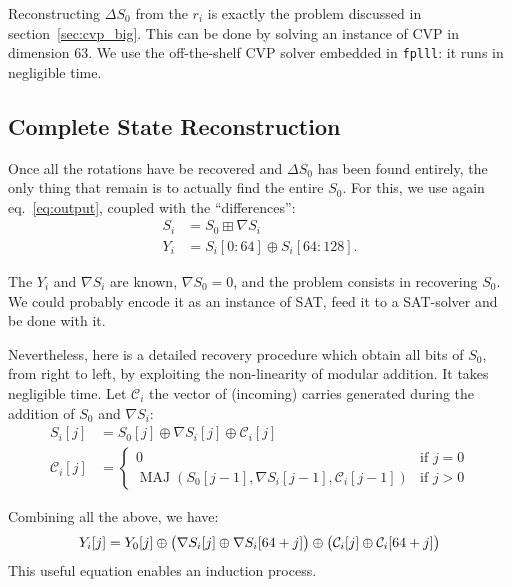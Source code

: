 \documentclass[journal=tosc,final]{iacrtrans}
\DeclareMathOperator{\MAJ}{MAJ}
\begin{document}
Reconstructing $\Delta S_0$ from the $r_i$ is exactly the problem discussed in
section~\ref{sec:cvp_big}. This can be done by solving an instance of CVP in
dimension $63$. We use the off-the-shelf CVP solver embedded in \texttt{fplll}:
it runs in negligible time.

\subsection{Complete State Reconstruction}

Once all the rotations have be recovered and $\Delta S_0$ has been found
entirely, the only thing that remain is to actually find the entire $S_0$. For
this, we use again eq.~\eqref{eq:output}, coupled with the ``differences'':
\begin{align*}
  S_i &= S_0 \boxplus \nabla S_i \\
  Y_i &= S_i[0:64] \oplus S_i[64:128].
\end{align*}

The $Y_i$ and $\nabla S_i$ are known, $\nabla S_0 = 0$, and the problem consists
in recovering $S_0$. We could probably encode it as an instance of \textsf{SAT},
feed it to a SAT-solver and be done with it.

Nevertheless, here is a detailed recovery procedure which obtain all bits of
$S_0$, from right to left, by exploiting the non-linearity of modular
addition. It takes negligible time. Let $\mathcal{C}_i$ the vector of (incoming)
carries generated during the addition of $S_0$ and $\nabla S_i$:
\begin{align*}
  S_i[j]           &= S_0[j] \oplus \nabla S_i[j] \oplus \mathcal{C}_i[j]\\
  \mathcal{C}_i[j] &= \begin{cases}
    0 &\text{if } j = 0 \\
    \MAJ(S_0[j-1], \nabla S_i[j-1], \mathcal{C}_i[j-1]) &\text{if } j > 0
  \end{cases}
\end{align*}

Combining all the above, we have:
\begin{equation}\label{eq:master}
  Y_i[j] = Y_0[j] \oplus \bigl( \nabla S_i[j] \oplus \nabla S_i[64+j] \bigr) \oplus \bigl(\mathcal{C}_i[j] \oplus \mathcal{C}_i[64+j]\bigr)\\
\end{equation}
This useful equation enables an induction process.
\end{document}

